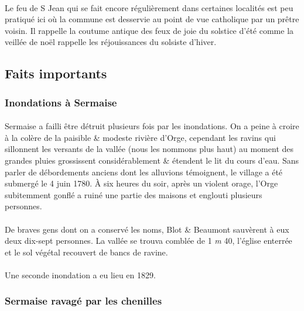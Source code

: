\documentclass[../eBook.tex]{subfiles}
\begin{document}
      \paragraph{}Le feu de S Jean qui se fait encore régulièrement dans certaines localités est peu pratiqué ici où la commune est desservie au point de vue catholique par un prêtre voisin. Il rappelle la coutume antique des feux de joie du solstice d'été comme la veillée de noël rappelle les réjouissances du solsiste d'hiver.

  \subsection*{Faits importants}
    \subsubsection*{Inondations à Sermaise}
      \paragraph{}Sermaise a failli être détruit plusieurs fois par les inondations. On a peine à croire à la colère de la paisible \& modeste rivière d'Orge, cependant les ravins qui sillonnent les versants de la vallée (nous les nommons plus haut) au moment des grandes pluies grossissent considérablement \& étendent le lit du cours d'eau. Sans parler de débordements anciens dont les alluvions témoignent, le village a été submergé le 4 juin 1780. À six heures du soir, après un violent orage, l'Orge subitemment gonflé a ruiné une partie des maisons et englouti plusieurs personnes.
      \paragraph{}De braves gens dont on a conservé les noms, Blot \& Beaumont sauvèrent à eux deux dix-sept personnes. La vallée se trouva comblée de 1 \textit{m} 40, l'église enterrée et le sol végétal recouvert de bancs de ravine.
      \paragraph{}Une seconde inondation a eu lieu en 1829.

    \subsubsection*{Sermaise ravagé par les chenilles}
\end{document}
